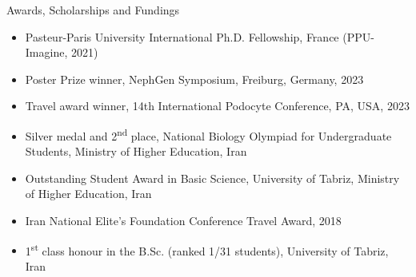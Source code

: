 \documentclass[
	11pt, %
]{resume} %
\begin{document}
\begin{rSection}{Awards, Scholarships and Fundings}

\begin{itemize}
  \item Pasteur-Paris University International Ph.D. Fellowship, France (PPU-Imagine, 2021)
  \item Poster Prize winner, NephGen Symposium, Freiburg, Germany, 2023
  \item Travel award winner, 14th International Podocyte Conference, PA, USA, 2023
  \item Silver medal and 2\textsuperscript{nd} place, National Biology Olympiad for Undergraduate Students, 
        Ministry of Higher Education, Iran
  \item Outstanding Student Award in Basic Science, University of Tabriz, Ministry of Higher Education, Iran
  \item Iran National Elite’s Foundation Conference Travel Award, 2018
  \item 1\textsuperscript{st} class honour in the B.Sc. (ranked 1/31 students), University of Tabriz, Iran
\end{itemize}

\end{rSection}

\end{document}
